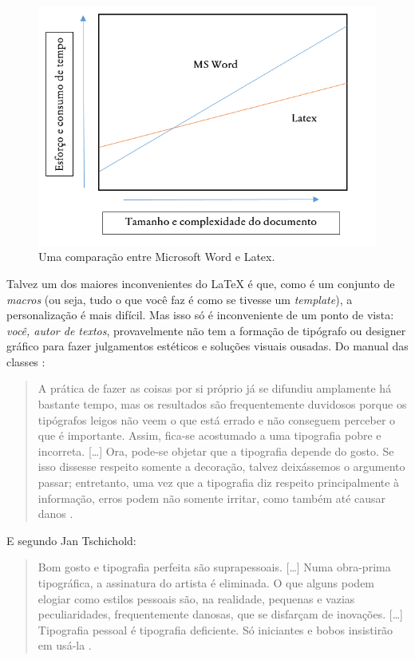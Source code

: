 \documentclass[a4paper,numbers=noenddot,abstract,DIV=calc]{scrbook} %
\begin{document}
\begin{figure}
\centering
\includegraphics[width=0.5\linewidth]{grafico-latex}
\caption{Uma comparação entre Microsoft Word e Latex.}
\label{fig:grafico-latex}
\end{figure}

Talvez um dos maiores inconvenientes do \LaTeX{} é que, como é um conjunto de \textit{macros} (ou seja, tudo o que você faz é como se tivesse um \textit{template}), a personalização é mais difícil. Mas isso só é inconveniente de um ponto de vista: \textit{você, autor de textos}, provavelmente não tem a formação de tipógrafo ou designer gráfico para fazer julgamentos estéticos e soluções visuais ousadas. Do manual das classes \KOMAScript{}:

\begin{quote}
A prática de fazer as coisas por si próprio já se difundiu amplamente há bastante tempo, mas os resultados são frequentemente duvidosos porque os tipógrafos leigos não veem o que está errado e não conseguem perceber o que é importante. Assim, fica-se acostumado a uma tipografia pobre e incorreta. [\ldots ] Ora, pode-se objetar que a tipografia depende do gosto. Se isso dissesse respeito somente a decoração, talvez deixássemos o argumento passar; entretanto, uma vez que a tipografia diz respeito principalmente à informação, erros podem não somente irritar, como também até causar danos \parencite{willberg2000}.
\end{quote}

E segundo Jan Tschichold:


\begin{quote}
Bom gosto e tipografia perfeita são suprapessoais. [\ldots] 
Numa obra-prima tipográfica, a assinatura do artista é eliminada. O que alguns podem elogiar como estilos pessoais são, na realidade, pequenas e vazias peculiaridades, frequentemente danosas, que se disfarçam de inovações. [\ldots] Tipografia pessoal é tipografia deficiente. Só iniciantes e bobos insistirão em usá-la \parencite[p. 25--26]{tschichold2007forma}.
\end{quote}
\end{document}

